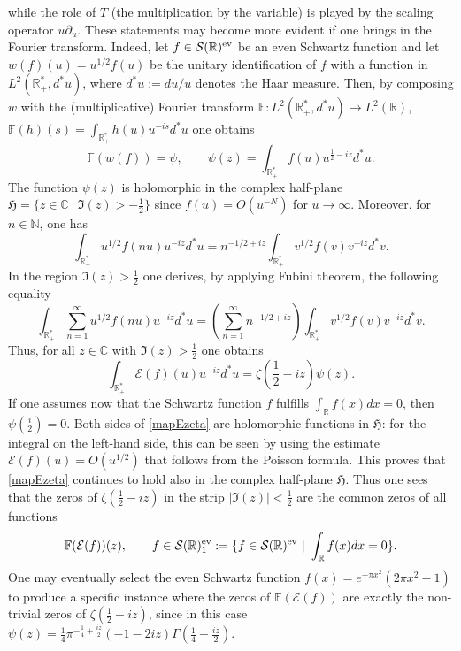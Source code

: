 \documentclass{pspum-l}
\theoremstyle{definition}
\theoremstyle{remark}
\numberwithin{equation}{section}
\def\C{{\mathbb C}}
\def\F{{\mathbb F}}
\def\R{{\mathbb R}}
\def\cE{{\mathcal E}}
\def\cS{{\mathcal S}}
\def\fourier{\F}
\def\N{{\mathbb N}}
\begin{document}
 while the role of $T$ (the multiplication by the variable) is played by the scaling operator $u\partial_u$. These statements may become  more evident if one brings in the Fourier transform.
 Indeed, let $f\in \cS(\R)^{\rm ev}$ be an even Schwartz function  and let $w(f)(u)=u^{1/2}f(u)$ be the unitary identification  of $f$ with a function in $L^2(\R_+^*,d^*u)$, where  $d^*u:=du/u$ denotes the Haar measure. Then, by composing $w$ with the  (multiplicative) Fourier transform $\fourier: L^2(\R_+^*,d^*u)\to L^2(\R)$,  $\fourier(h)(s)=\int_{\R_+^*}h(u)u^{-is}d^*u$ one obtains 
 \[
 \fourier(w(f))=\psi, \qquad   
\psi(z)=\int_{\R_+^*}f(u)u^{\frac 12-iz}d^*u.
\]
The function $\psi(z)$ is holomorphic in the complex half-plane $\mathfrak H=\{z\in\C~|~\Im(z)>-\frac 12\}$ since $f(u)=O(u^{-N})$ for $u\to \infty$. Moreover, for $n\in\N$, one has
\[
\int_{\R_+^*}u^{1/2}f(nu)u^{-iz}d^*u=n^{-1/2+iz}\int_{\R_+^*}v^{1/2}f(v)v^{-iz}d^*v.
\]
In the region $\Im(z)>\frac 12$ one derives, by applying Fubini theorem, the following equality
\[
\int_{\R_+^*}{\sum_{n=1}^\infty} u^{1/2}f(nu)u^{-iz}d^*u= \left({\sum_{n=1}^\infty} n^{-1/2+iz}\right)\int_{\R_+^*}v^{1/2}f(v)v^{-iz}d^*v.
\]
Thus, for all $z\in\C$ with $\Im(z)>\frac 12$ one obtains 
\begin{equation}\label{mapEzeta}
	\int_{\R_+^*}\cE(f)(u)u^{-iz}d^*u=\zeta(\frac 12-iz)\psi(z).
\end{equation}
If one assumes now that the Schwartz function $f$ fulfills  $\int_\R f(x)dx=0$, then $\psi(\frac i2)=0$. Both  sides of \eqref{mapEzeta} are holomorphic functions in  $\mathfrak H$: for the integral on the left-hand side, this can be seen by using the estimate $\cE(f)(u)=O(u^{1/2})$ that follows from the Poisson formula. This proves that \eqref{mapEzeta} continues to hold also in the complex half-plane $\mathfrak H$.  Thus one sees that  the zeros of $\zeta(\frac 12-iz)$  in the strip $\vert \Im(z)\vert <\frac 12$ are the common zeros of all functions
 \begin{equation*}\label{mapErange}
 \fourier(\cE(f))(z), \qquad f \in \cS(\R)^{\rm ev}_1:=\{ f \in \cS(\R)^{\rm ev}~|~  \int_\R f(x)dx=0\}.
 \end{equation*} 
One may eventually select the even Schwartz function $f(x)=e^{-\pi  x^2} \left(2 \pi  x^2-1\right)$ to produce a specific instance where the zeros of $\fourier(\cE(f))$ are exactly the non-trivial zeros of $\zeta(\frac 12-iz)$, since in this case  $\psi(z)=\frac{1}{4} \pi ^{-\frac{1}{4}+\frac{i z}{2}} (-1-2 i z) \Gamma \left(\frac{1}{4}-\frac{i z}{2}\right)$.
\end{document}
